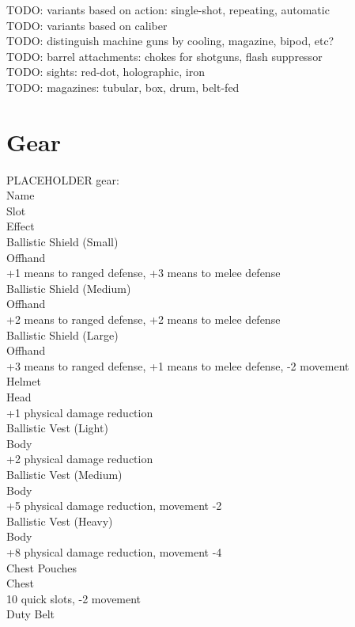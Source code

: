 \documentclass[letterpaper,titlepage,openany,twocolumn]{book}
\begin{document}
TODO: variants based on action: single-shot, repeating, automatic\\
TODO: variants based on caliber\\
TODO: distinguish machine guns by cooling, magazine, bipod, etc?\\
TODO: barrel attachments: chokes for shotguns, flash suppressor\\
TODO: sights: red-dot, holographic, iron\\
TODO: magazines: tubular, box, drum, belt-fed\\

\section{Gear}
PLACEHOLDER gear:\\
Name\\
Slot\\
Effect\\
Ballistic Shield (Small)\\
Offhand\\
+1 means to ranged defense,  +3 means to melee defense\\
Ballistic Shield (Medium)\\
Offhand\\
+2 means to ranged defense, +2 means to melee defense\\
Ballistic Shield (Large)\\
Offhand\\
+3 means to ranged defense, +1 means to melee defense, -2 movement\\
Helmet\\
Head\\
+1 physical damage reduction\\
Ballistic Vest (Light)\\
Body\\
+2 physical damage reduction\\
Ballistic Vest (Medium)\\
Body\\
+5 physical damage reduction, movement -2\\
Ballistic Vest (Heavy)\\
Body\\
+8 physical damage reduction, movement -4\\
Chest Pouches\\
Chest\\
10 quick slots, -2 movement\\
Duty Belt\\
\end{document}
